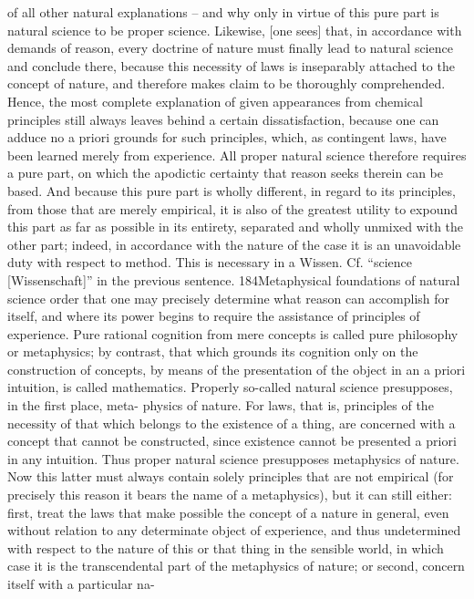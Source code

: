 of all other natural explanations – and why only in virtue of this pure
part is natural science to be proper science. Likewise, [one sees] that,
in accordance with demands of reason, every doctrine of nature must
ﬁnally lead to natural science and conclude there, because this necessity
of laws is inseparably attached to the concept of nature, and therefore
makes claim to be thoroughly comprehended. Hence, the most complete
explanation of given appearances from chemical principles still always
leaves behind a certain dissatisfaction, because one can adduce no a priori
grounds for such principles, which, as contingent laws, have been learned
merely from experience.
All proper natural science therefore requires a pure part, on which the
apodictic certainty that reason seeks therein can be based. And because
this pure part is wholly different, in regard to its principles, from those
that are merely empirical, it is also of the greatest utility to expound
this part as far as possible in its entirety, separated and wholly unmixed
with the other part; indeed, in accordance with the nature of the case
it is an unavoidable duty with respect to method. This is necessary in
a
Wissen. Cf. “science [Wissenschaft]” in the previous sentence.
184Metaphysical foundations of natural science
order that one may precisely determine what reason can accomplish for
itself, and where its power begins to require the assistance of principles
of experience. Pure rational cognition from mere concepts is called pure
philosophy or metaphysics; by contrast, that which grounds its cognition
only on the construction of concepts, by means of the presentation of the
object in an a priori intuition, is called mathematics.
Properly so-called natural science presupposes, in the ﬁrst place, meta-
physics of nature. For laws, that is, principles of the necessity of that
which belongs to the existence of a thing, are concerned with a concept
that cannot be constructed, since existence cannot be presented a priori
in any intuition. Thus proper natural science presupposes metaphysics of
nature. Now this latter must always contain solely principles that are not
empirical (for precisely this reason it bears the name of a metaphysics),
but it can still either: ﬁrst, treat the laws that make possible the concept
of a nature in general, even without relation to any determinate object of
experience, and thus undetermined with respect to the nature of this or
that thing in the sensible world, in which case it is the transcendental part
of the metaphysics of nature; or second, concern itself with a particular na-
